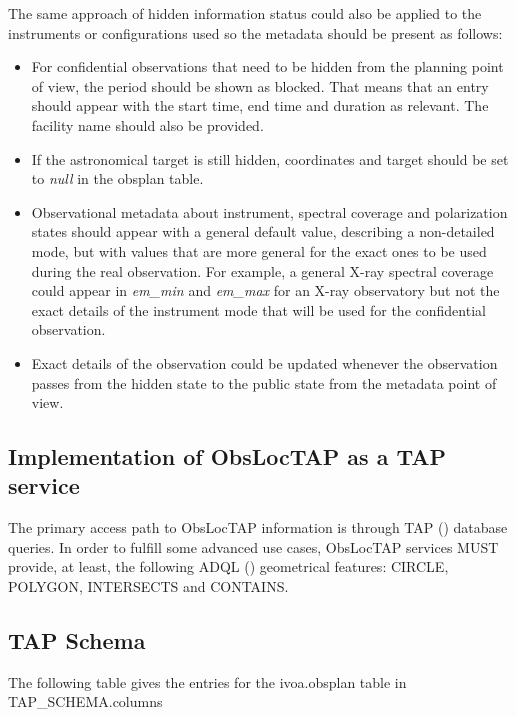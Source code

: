 \documentclass[11pt,a4paper]{ivoa}
\begin{document}
The same approach of hidden information status could also be applied to the
instruments or configurations used so the metadata should be present as follows:

\begin{itemize}
	\item{For confidential observations that need to be hidden from the planning
  point of view, the period should be shown as blocked. That means that an entry
  should appear with the start time, end time and duration as relevant. The
  facility name should also be provided.}

	\item{If the astronomical target is still hidden, coordinates and target
  should be set to \textit{null} in the obsplan table.}

	\item{Observational metadata about instrument, spectral coverage and
  polarization states should appear with a general default value, describing a
  non-detailed mode, but with values that are more general for the exact ones
  to be used during the real observation. For example, a general X-ray spectral
  coverage could appear in \textit{em\_min} and \textit{em\_max} for an X-ray
  observatory but not the exact details of the instrument mode that will be used
  for the confidential observation.}

	\item{Exact details of the observation could be updated whenever the
  observation passes from the hidden state to the public state from the
  metadata point of view.}

\end{itemize}

\subsection{Implementation of ObsLocTAP as a TAP service}
The primary access path to ObsLocTAP information is through TAP
(\cite{2010ivoa.spec.0327D}) database queries. In order to fulfill some advanced
use cases, ObsLocTAP services MUST provide, at least, the following ADQL
(\cite{2008ivoa.spec.1030O}) geometrical features: CIRCLE, POLYGON, INTERSECTS
and CONTAINS.\par

\subsection{TAP Schema}
The following table gives the entries for the ivoa.obsplan table in
TAP\_SCHEMA.columns
\end{document}
